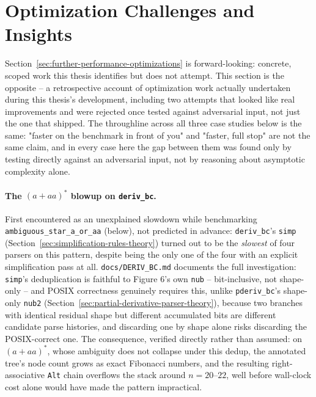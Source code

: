 \section{Optimization Challenges and Insights}
\label{sec:optimization-challenges}

Section~\ref{sec:further-performance-optimizations} is forward-looking:
concrete, scoped work this thesis identifies but does not attempt. This
section is the opposite -- a retrospective account of optimization work
actually undertaken during this thesis's development, including two
attempts that looked like real improvements and were rejected once tested
against adversarial input, not just the one that shipped. The throughline
across all three case studies below is the same: "faster on the
benchmark in front of you" and "faster, full stop" are not the same
claim, and in every case here the gap between them was found only by
testing directly against an adversarial input, not by reasoning about
asymptotic complexity alone.

\paragraph{The $(a+aa)^{*}$ blowup on \texttt{deriv\_bc}.} First
encountered as an unexplained slowdown while benchmarking
\texttt{ambiguous\_star\_a\_or\_aa} (below), not predicted in advance:
\texttt{deriv\_bc}'s \texttt{simp} (Section~\ref{sec:simplification-rules-theory})
turned out to be the \emph{slowest} of four parsers on this pattern,
despite being the only one of the four with an explicit simplification
pass at all. \texttt{docs/DERIV\_BC.md} documents the full investigation:
\texttt{simp}'s deduplication is faithful to Figure 6's own \texttt{nub}
-- bit-inclusive, not shape-only -- and POSIX correctness genuinely
requires this, unlike \texttt{pderiv\_bc}'s shape-only \texttt{nub2}
(Section~\ref{sec:partial-derivative-parser-theory}), because two
branches with identical residual shape but different accumulated bits
are different candidate parse histories, and discarding one by shape
alone risks discarding the POSIX-correct one. The consequence, verified
directly rather than assumed: on $(a+aa)^{*}$, whose ambiguity does not
collapse under this dedup, the annotated tree's node count grows as
exact Fibonacci numbers, and the resulting right-associative \texttt{Alt}
chain overflows the stack around $n=20$--$22$, well before wall-clock
cost alone would have made the pattern impractical.

